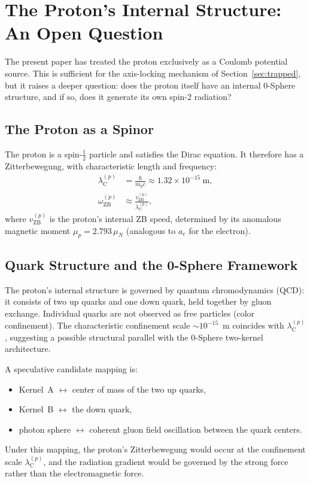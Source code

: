 \documentclass[%
 reprint, amsmath,amssymb, aps, prd, ]{revtex4-2}
\numberwithin{equation}{section}
\newcommand{\lambdaCp}{\lambda_{\mathrm{C}}^{(p)}}
\newcommand{\omZBp}{\omega_{\mathrm{ZB}}^{(p)}}
\begin{document}
\section{The Proton's Internal Structure: An Open Question}
\label{sec:proton}

The present paper has treated the proton exclusively as a Coulomb potential source.
This is sufficient for the axis-locking mechanism of Section~\ref{sec:trapped}, but it raises a deeper question: does the proton itself have an internal 0-Sphere structure, and if so, does it generate its own spin-2 radiation?

\subsection{The Proton as a Spinor}

The proton is a spin-$\frac{1}{2}$ particle and satisfies the Dirac equation.
It therefore has a Zitterbewegung, with characteristic length and frequency:
\begin{align}
\lambdaCp &= \frac{\hbar}{m_p c} \approx 1.32\times10^{-15}\ \text{m},
\label{eq:lambdaCp}\\
\omZBp &\approx \frac{v_\mathrm{ZB}^{(p)}}{\lambdaCp},
\label{eq:omZBp}
\end{align}
where $v_\mathrm{ZB}^{(p)}$ is the proton's internal ZB speed, determined by its anomalous magnetic moment $\mu_p = 2.793\,\mu_N$ (analogous to $a_e$ for the electron).

\subsection{Quark Structure and the 0-Sphere Framework}

The proton's internal structure is governed by quantum chromodynamics (QCD): it consists of two up quarks and one down quark, held together by gluon exchange.
Individual quarks are not observed as free particles (color confinement).
The characteristic confinement scale $\sim 10^{-15}$~m coincides with $\lambdaCp$, suggesting a possible structural parallel with the 0-Sphere two-kernel architecture.

A speculative candidate mapping is:
\begin{itemize}[leftmargin=2em, itemsep=2pt]
\item Kernel~A $\leftrightarrow$ center of mass of the two up quarks,
\item Kernel~B $\leftrightarrow$ the down quark,
\item photon sphere $\leftrightarrow$ coherent gluon field oscillation between the quark centers.
\end{itemize}
Under this mapping, the proton's Zitterbewegung would occur at the confinement scale $\lambdaCp$, and the radiation gradient would be governed by the strong force rather than the electromagnetic force.
\end{document}

